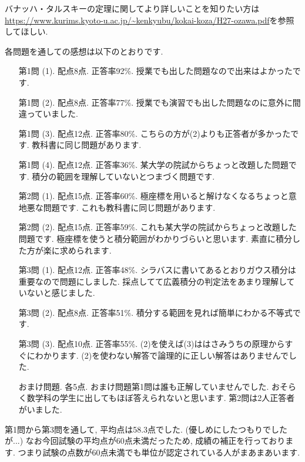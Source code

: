 \documentclass[dvipdfmx,a4paper,11pt]{article}
\theoremstyle{definition}
\begin{document}
バナッハ・タルスキーの定理に関してより詳しいことを知りたい方は\url{https://www.kurims.kyoto-u.ac.jp/~kenkyubu/kokai-koza/H27-ozawa.pdf}を参照してほしい.


 \vspace{33pt} 
   
   \hspace{-11pt}{\Large 期末試験について.}


各問題を通しての感想は以下のとおりです.
\begin{itemize}
\item [第1問 (1).] 配点8点. 正答率92\%.  授業でも出した問題なので出来はよかったです. 
\item [第1問 (2).] 配点8点. 正答率77\%. 授業でも演習でも出した問題なのに意外に間違っていました.
\item [第1問 (3).] 配点12点. 正答率80\%. こちらの方が(2)よりも正答者が多かったです. 教科書に同じ問題があります.
\item [第1問 (4).] 配点12点. 正答率36\%. 某大学の院試からちょっと改題した問題です. 積分の範囲を理解していないとつまづく問題です. 
\item [第2問 (1).] 配点15点. 正答率60\%. 極座標を用いると解けなくなるちょっと意地悪な問題です. これも教科書に同じ問題があります.
\item [第2問 (2).] 配点15点. 正答率59\%. これも某大学の院試からちょっと改題した問題です. 極座標を使うと積分範囲がわかりづらいと思います. 素直に積分した方が楽に求められます.
\item [第3問 (1).] 配点12点. 正答率48\%. シラバスに書いてあるとおりガウス積分は重要なので問題にしました. 採点してて広義積分の判定法をあまり理解していないと感じました. 
\item [第3問 (2).]  配点8点. 正答率51\%. 積分する範囲を見れば簡単にわかる不等式です. 
\item [第3問 (3).] 配点10点. 正答率55\%. (2)を使えば(3)ははさみうちの原理からすぐにわかります. (2)を使わない解答で論理的に正しい解答はありませんでした. 
\item [おまけ問題. ] 各5点. おまけ問題第1問は誰も正解していませんでした. おそらく数学科の学生に出してもほぼ答えられないと思います. 第2問は2人正答者がいました.  
\end{itemize}
第1問から第3問を通して, 平均点は58.3点でした. (優しめにしたつもりでしたが...)
なお今回試験の平均点が60点未満だったため, 成績の補正を行っております. つまり試験の点数が60点未満でも単位が認定されている人がまあまあいます. 
 

 
\end{document}

